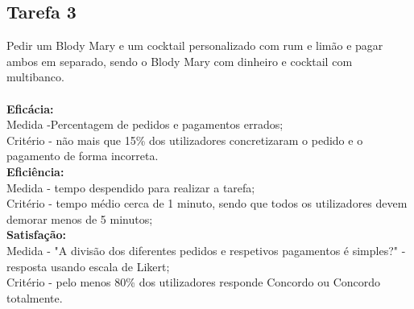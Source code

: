 \documentclass{article}
\begin{document}
\subsection*{Tarefa 3}
Pedir um Blody Mary e um cocktail personalizado com rum e limão e pagar ambos em separado, sendo o Blody Mary com dinheiro e cocktail com multibanco.\\\\
\textbf{Eficácia:}\\
Medida -Percentagem de pedidos e pagamentos errados;\\
Critério - não mais que 15\% dos utilizadores concretizaram o pedido e o pagamento de forma incorreta.\\
\textbf{Eficiência:}\\
Medida - tempo despendido para realizar a tarefa;\\
Critério - tempo médio cerca de 1 minuto, sendo que todos os utilizadores devem demorar menos de 5 minutos;\\
\textbf{Satisfação:}\\
Medida - "A divisão dos diferentes pedidos e respetivos pagamentos é simples?" - resposta usando escala de Likert;\\
Critério - pelo menos 80\% dos utilizadores responde Concordo ou Concordo totalmente.
\end{document}
